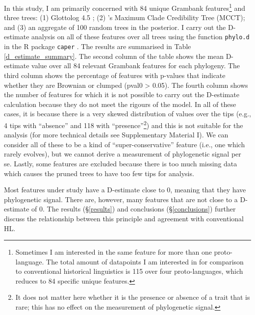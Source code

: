 \documentclass[12pt,letterpaper]{article}
\begin{document}
In this study, I am primarily concerned with 84 unique Grambank features\footnote{Sometimes I am interested in the same feature for more than one proto-language. The total amount of datapoints I am interested in for comparison to conventional historical linguistics is 115 over four proto-languages, which reduces to 84 specific unique features.} and three trees: (1) Glottolog 4.5 \citep{glottolog4_5}; (2) \citet{grayetal_2009}'s Maximum Clade Credibility Tree (MCCT); and (3) an aggregate of 100 random trees in the \citet{grayetal_2009} posterior. I carry out the D-estimate analysis on all of these features over all trees using the function \texttt{phylo.d} in the R package \texttt{caper} \citep{orme2013caper}. The results are summarised in Table \ref{d_estimate_summary}. The second column of the table shows the mean D-estimate value over all 84 relevant Grambank features for each phylogeny. The third column shows the percentage of features with p-values that indicate whether they are Brownian or clumped (pval0 > 0.05). The fourth column shows the number of features for which it is not possible to carry out the D-estimate calculation because they do not meet the rigours of the model. In all of these cases, it is because there is a very skewed distribution of values over the tips (e.g., 4 tips with ``absence'' and 118 with ``presence''\footnote{It does not matter here whether it is the presence or absence of a trait that is rare; this has no effect on the measurement of phylogenetic signal.}) and this is not suitable for the analysis (for more technical details see Supplementary Material I). We can consider all of these to be a kind of ``super-conservative'' feature (i.e., one which rarely evolves), but we cannot derive a measurement of phylogenetic signal per se. Lastly, some features are excluded because there is too much missing data which causes the pruned trees to have too few tips for analysis.



Most features under study have a D-estimate close to 0, meaning that they have phylogenetic signal. There are, however, many features that are not close to a D-estimate of 0. The results (§\ref{results}) and conclusions  (§\ref{conclusions}) further discuss the relationship between this principle and agreement with conventional HL.
\end{document}
